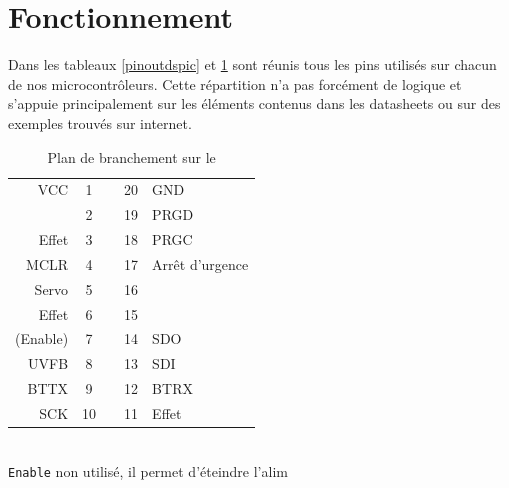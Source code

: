 		\section{Fonctionnement}
		Dans les tableaux \ref{pinoutdspic} et \ref{pinoutpic} sont réunis tous les pins utilisés sur chacun de nos microcontrôleurs. Cette répartition n'a pas forcément de logique et s'appuie principalement sur les éléments contenus dans les datasheets ou sur des exemples trouvés sur internet.\\
		\begin{table}[h]
			\begin{multicols}{2}
			\begin{center}
			
			
			\begin{footnotesize}
			\begin{tabular}{r|ccc|l}
				VCC		& 1 &   & 20 & GND \\ 
				  		& 2 &   & 19 & PRGD \\ 
				Effet	& 3 &   & 18 & PRGC \\ 
				MCLR 	& 4 &   & 17 & Arrêt d'urgence \\ 
				Servo 	& 5 &   & 16 &   \\
				 Effet	& 6 &   & 15 &   \\ 
				(Enable)	& 7 &   & 14 & SDO \\ 
				UVFB 	& 8 &   & 13 & SDI \\ 
				BTTX 	& 9 &   & 12 & BTRX \\ 
				SCK 	& 10&   & 11 & Effet   \\ 
				\end{tabular} 
				\\ \texttt{Enable} non utilisé, il permet d'éteindre l'alim
			\end{footnotesize}
				
			
			\caption{Plan de branchement sur le \pic}
			\label{pinoutpic}
		

\end{center}
\end{multicols}
\end{table}
